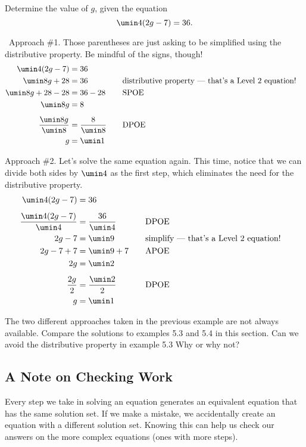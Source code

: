 \begin{boxedex}
Determine the value of $g$, given the equation \[\umin4(2g - 7) = 36.\]

\exsoln\ Approach \#1. Those parentheses are just asking to be simplified using the distributive property. Be mindful of the signs, though!
\[\begin{aligned}
\umin4(2g - 7) &= 36\\
\umin8g + 28 &= 36
&&\text{\quad distributive property --- that's a Level 2 equation!}\\
\umin8g + 28 - 28 &= 36 - 28
&&\text{\quad SPOE}\\
\umin8g &= 8\\[1ex]
\frac{\umin8g}{\umin8} &= \frac{8}{\umin8}
&&\text{\quad DPOE}\\
g &= \umin1
\end{aligned}\]

Approach \#2. Let's solve the same equation again. This time, notice that we can divide both sides by $\umin4$ as the first step, which eliminates the need for the distributive property.
\[\begin{aligned}
\umin4(2g - 7) &= 36\\[1ex]
\frac{\umin4(2g-7)}{\umin4} &= \frac{36}{\umin4}
&&\text{\quad DPOE}\\
2g-7 &= \umin9
&&\text{\quad simplify --- that's a Level 2 equation!}\\
2g-7+7 &= \umin9+7
&&\text{\quad APOE}\\
2g &= \umin2
&&\text{\quad}\\[1ex]
\frac{2g}{2} &= \frac{\umin2}{2}
&&\text{\quad DPOE}\\
g &= \umin1
\end{aligned}\]

\end{boxedex}

The two different approaches taken in the previous example are not always available. Compare the solutions to examples 5.3 and 5.4 in this section. Can we avoid the distributive property in example 5.3 Why or why not?

\subsection{A Note on Checking Work}

Every step we take in solving an equation generates an equivalent equation that has the same solution set. If we make a mistake, we accidentally create an equation with a different solution set. Knowing this can help us check our answers on the more complex equations (ones with more steps).

